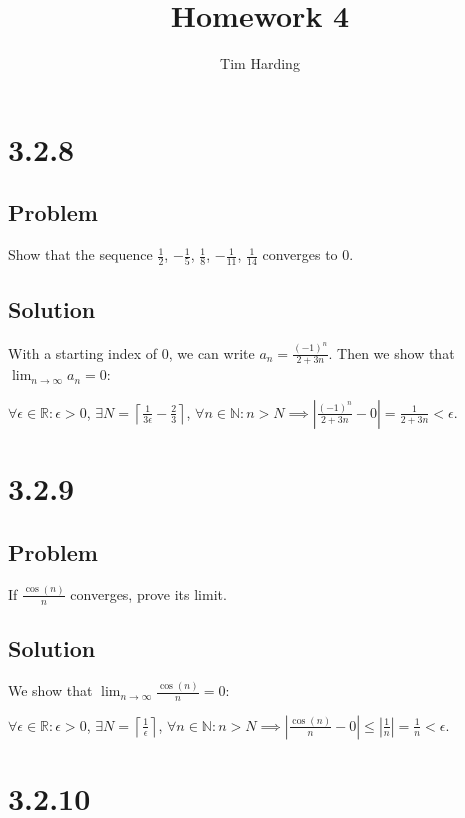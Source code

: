 \documentclass[12pt]{article}
\title{Homework 4}
\author{Tim Harding}
\newcommand{\abs}  [1]{\left|       #1 \right|      }
\newcommand{\ceil} [1]{\left\lceil  #1 \right\rceil }
\newcommand{\R}    [0]{\mathbb{R}                   }
\newcommand{\N}    [0]{\mathbb{N}                   }
\begin{document}
\maketitle

\section*{3.2.8}

\subsection*{Problem}

Show that the sequence $\frac{1}{2}$, $-\frac{1}{5}$, $\frac{1}{8}$, $-\frac{1}{11}$, $\frac{1}{14}$ converges to 0.

\subsection*{Solution}
With a starting index of 0, we can write $a_n = \frac{(-1)^n}{2 + 3n}$. Then we show that $\lim_{n\to\infty} a_n = 0$:

$\forall \epsilon \in \R : \epsilon > 0$, $\exists N = \ceil{\frac{1}{3\epsilon} - \frac{2}{3}}$, $\forall n \in \N : n > N \implies \abs{\frac{(-1)^n}{2+3n} - 0} = \frac{1}{2+3n} < \epsilon$.



\section*{3.2.9}

\subsection*{Problem}
If $\frac{\cos(n)}{n}$ converges, prove its limit.

\subsection*{Solution}
We show that $\lim_{n\to\infty} \frac{\cos(n)}{n} = 0$:

$\forall \epsilon \in \R : \epsilon > 0$, $\exists N = \ceil{\frac{1}{\epsilon}}$, $\forall n \in \N : n > N \implies \abs{\frac{\cos(n)}{n} - 0} \leq \abs{\frac{1}{n}} = \frac{1}{n} < \epsilon$.




\section*{3.2.10}
\end{document}
